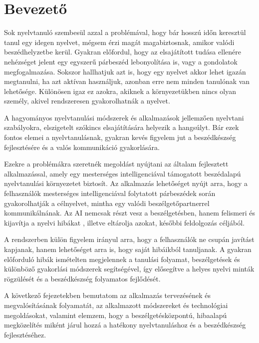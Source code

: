 \chapter{Bevezető}%

Sok nyelvtanuló szembesül azzal a problémával, hogy bár hosszú időn keresztül tanul egy idegen nyelvet, mégsem érzi magát magabiztosnak, amikor valódi beszédhelyzetbe kerül. Gyakran előfordul, hogy az elsajátított tudása ellenére nehézséget jelent egy egyszerű párbeszéd lebonyolítása is, vagy a gondolatok megfogalmazása. Sokszor hallhatjuk azt is, hogy egy nyelvet akkor lehet igazán megtanulni, ha azt aktívan használjuk\cite{swain1985communicative,long1996role}, azonban erre nem minden tanulónak van lehetősége. Különösen igaz ez azokra, akiknek a környezetükben nincs olyan személy, akivel rendszeresen gyakorolhatnák a nyelvet.

A hagyományos nyelvtanulási módszerek és alkalmazások jellemzően nyelvtani szabályokra, elszigetelt szókincs elsajátítására helyezik a hangsúlyt. Bár ezek fontos elemei a nyelvtanulásnak, gyakran kevés figyelem jut a beszédkészség fejlesztésére és a valós kommunikáció gyakorlására. \cite{swain1985communicative,long1996role}

Ezekre a problémákra szeretnék megoldást nyújtani az általam fejlesztett alkalmazással, amely egy mesterséges intelligenciával támogatott beszédalapú nyelvtanulási környezetet biztosít. Az alkalmazás lehetőséget nyújt arra, hogy a felhasználók mesterséges intelligenciával folytatott párbeszédek során gyakorolhatják a célnyelvet, mintha egy valódi beszélgetőpartnerrel kommunikálnának. \cite{xiao2024conversational} Az AI nemcsak részt vesz a beszélgetésben, hanem felismeri és kijavítja a nyelvi hibákat \cite{lyster2013oral,sato2012peer}, illetve eltárolja azokat, későbbi feldolgozás céljából.

A rendszerben külön figyelem irányul arra, hogy a felhasználók ne csupán javítást kapjanak, hanem lehetőséget arra is, hogy saját hibáikból tanuljanak. A gyakran előforduló hibák ismételten megjelennek a tanulási folyamat, beszélgetések és különböző gyakorlási módszerek segítségével, így elősegítve a helyes nyelvi minták rögzülését és a beszédkészség folyamatos fejlődését.

A következő fejezetekben bemutatom az alkalmazás tervezésének és megvalósításának folyamatát, az alkalmazott módszereket és technológiai megoldásokat, valamint elemzem, hogy a beszélgetésközpontú, hibaalapú megközelítés miként járul hozzá a hatékony nyelvtanuláshoz és a beszédkészség fejlesztéséhez.